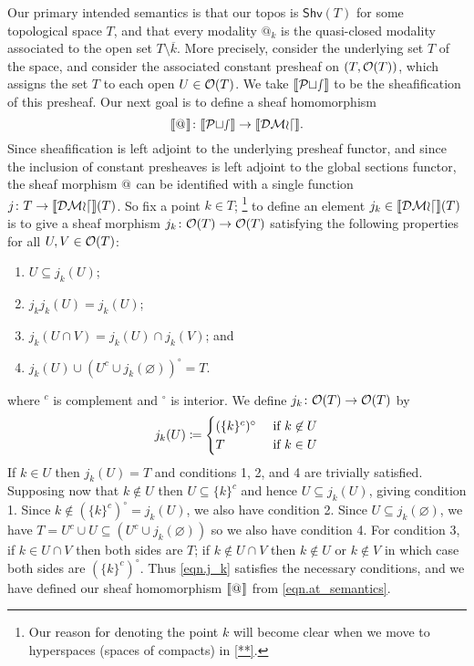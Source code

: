 \documentclass[11pt, oneside, article]{memoir}
\makeatletter
\theoremstyle{plain}
\theoremstyle{definition}
\theoremstyle{remark}
\renewcommand{\ss}{\subseteq}
\DeclarePairedDelimiter{\church}{\llbracket}{\rrbracket}
\newcommand{\Fun}[1]{\mathsf{#1}}
\newcommand{\tn}[1]{\textnormal{#1}}
\newcommand{\shv}{\Fun{Shv}}
\newcommand{\Op}[1][undef]{\ifthenelse{\equal{#1}{undef}}{\mathcal{O}}{\mathcal{O}(#1)}}
\newcommand{\pt}{k}				%
\newcommand{\Pts}{\mathcal{Pts}}		%
\newcommand{\decmod}{\mathcal{DMod}}
\newcommand{\AtSymbol}{{@}}
\newcommand{\At}[1][\pt]{\AtSymbol_{#1}}
\makeatother
\begin{document}
Our primary intended semantics is that our topos is $\shv(T)$ for some topological space $T$, and that every modality $\At$ is the quasi-closed modality associated to the open set $T \setminus \overline{\pt}$. More precisely, consider the underlying set $T$ of the space, and consider the associated constant presheaf on $(T,\Op[T])$, which assigns the set $T$ to each open $U\in\Op[T]$. We take $\church{\Pts}$ to be the sheafification of this presheaf. Our next goal is to define a sheaf homomorphism
\begin{equation}\label{eqn.at_semantics}
	\church{\At[]}\colon\church{\Pts}\to\church{\decmod}.
\end{equation}
Since sheafification is left adjoint to the underlying presheaf functor, and since the inclusion of constant presheaves is left adjoint to the global sections functor, the sheaf morphism $\At[]$ can be identified with a single function $j\colon T\to\church{\decmod}(T)$. So fix a point $\pt\in T$;%
\footnote{Our reason for denoting the point $\pt$ will become clear when we move to hyperspaces (spaces of compacts) in \cref{**}.} 
to define an element $j_\pt\in\church{\decmod}(T)$ is to give a sheaf morphism $j_\pt\colon\Op[T]\to\Op[T]$ satisfying the following properties for all $U,V\in\Op[T]$:
\begin{enumerate}
	\item $U\ss j_\pt(U)$;
	\item $j_\pt j_\pt(U)=j_\pt(U)$;
	\item $j_\pt(U\cap V)=j_\pt(U)\cap j_\pt(V)$; and
	\item $j_\pt(U)\cup (U^c\cup j_\pt(\varnothing))^\circ=T$.
\end{enumerate}
where $^c$ is complement and $^\circ$ is interior. We define $j_\pt\colon\Op[T]\to\Op[T]$ by
\begin{equation}\label{eqn.j_k}
	j_\pt(U)\coloneqq
	\begin{cases}
		(\{\pt\}^c)^\circ&\tn{ if }\pt\not\in U\\
		T&\tn{ if } \pt\in U
	\end{cases}
\end{equation}
If $\pt\in U$ then $j_\pt(U)=T$ and conditions 1, 2, and 4 are trivially satisfied. Supposing now that $\pt\not\in U$ then $U\ss \{\pt\}^c$ and hence $U\ss j_\pt(U)$, giving condition 1. Since $\pt\not\in(\{\pt\}^c)^\circ=j_\pt(U)$, we also have condition 2. Since $U\ss j_\pt(\varnothing)$, we have $T=U^c\cup U\ss (U^c\cup j_\pt(\varnothing))$ so we also have condition 4. For condition 3, if $\pt\in U\cap V$ then both sides are $T$; if $\pt\not\in U\cap V$ then $\pt\not\in U$ or $\pt\not\in V$ in which case both sides are $(\{\pt\}^c)^\circ$. Thus \eqref{eqn.j_k} satisfies the necessary conditions, and we have defined our sheaf homomorphism $\church{\At[]}$ from \eqref{eqn.at_semantics}.
\end{document}
